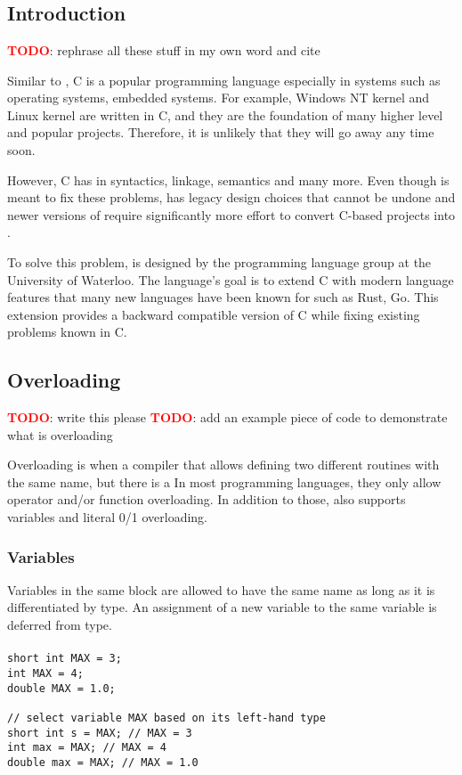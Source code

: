 \chapter{\CFA} \label{CFA}
\section{Introduction}
\textbf{\textcolor{red}{TODO}}: rephrase all these stuff in my own word and cite

Similar to \CC, C is a popular programming language especially in systems such
as operating systems, embedded systems. For example, Windows NT kernel and
Linux kernel are written in C, and they are the foundation of many higher level
and popular projects. Therefore, it is unlikely that they will go away any time soon.

However, C has in syntactics, linkage, semantics and many
more. Even though \CCS is meant to fix these problems, \CCS has legacy design
choices that cannot be undone and newer versions of \CCS require significantly
more effort to convert C-based projects into \CCS.

To solve this problem, \CFAS is designed by the programming language group at the
University of Waterloo. The language's goal is to extend C with modern language
features that many new languages have been known for such as Rust, Go. This
extension provides a backward compatible version of C while fixing existing
problems known in C.

\section{Overloading}
\textbf{\textcolor{red}{TODO}}: write this please
\textbf{\textcolor{red}{TODO}}: add an example piece of code to demonstrate what
is overloading

Overloading is when a compiler that allows defining two different routines with
the same name, but there is a
In most programming languages, they only allow operator and/or function overloading.
In addition to those, \uCPP also supports variables and literal 0/1 overloading.

\subsection{Variables}
Variables in the same block are allowed to have the same name as long as it is
differentiated by type. An assignment of a new variable to the same variable is
deferred from type.
\begin{frame}
\frametitle{}
\begin{lstlisting}
short int MAX = 3;
int MAX = 4;
double MAX = 1.0;

// select variable MAX based on its left-hand type
short int s = MAX; // MAX = 3
int max = MAX; // MAX = 4
double max = MAX; // MAX = 1.0
\end{lstlisting}
\end{frame}

